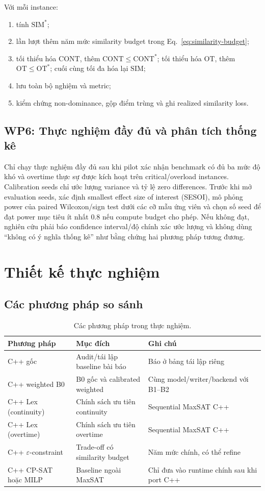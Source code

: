 \documentclass[12pt,a4paper]{article}
\newcommand{\SIM}{\mathrm{SIM}}
\newcommand{\CONT}{\mathrm{CONT}}
\newcommand{\OT}{\mathrm{OT}}
\begin{document}
Với mỗi instance:
\begin{enumerate}
  \item tính $\SIM^*$;
  \item lần lượt thêm năm mức similarity budget trong
        Eq.~\eqref{eq:similarity-budget};
  \item tối thiểu hóa $\CONT$, thêm $\CONT\leq\CONT^*$; tối thiểu hóa $\OT$,
        thêm $\OT\leq\OT^*$; cuối cùng tối đa hóa lại $\SIM$;
  \item lưu toàn bộ nghiệm và metric;
  \item kiểm chứng non-dominance, gộp điểm trùng và ghi realized similarity loss.
\end{enumerate}

\subsection{WP6: Thực nghiệm đầy đủ và phân tích thống kê}

Chỉ chạy thực nghiệm đầy đủ sau khi pilot xác nhận benchmark có đủ ba mức độ
khó và overtime thực sự được kích hoạt trên critical/overload instances.
Calibration seeds chỉ ước lượng variance và tỷ lệ zero differences. Trước khi
mở evaluation seeds, xác định smallest effect size of interest (SESOI), mô phỏng
power của paired Wilcoxon/sign test dưới các cỡ mẫu ứng viên và chọn số seed để
đạt power mục tiêu ít nhất $0.8$ nếu compute budget cho phép. Nếu không đạt,
nghiên cứu phải báo confidence interval/độ chính xác ước lượng và không dùng
``không có ý nghĩa thống kê'' như bằng chứng hai phương pháp tương đương.

\section{Thiết kế thực nghiệm}

\subsection{Các phương pháp so sánh}

\begin{table}[H]
\centering
\caption{Các phương pháp trong thực nghiệm.}
\begin{tabularx}{\textwidth}{@{}>{\raggedright\arraybackslash}p{3.4cm}YY@{}}
\toprule
Phương pháp & Mục đích & Ghi chú \\
\midrule
C++ gốc & Audit/tái lập baseline bài báo & Báo ở bảng tái lập riêng \\
C++ weighted B0 & B0 gốc và calibrated weighted & Cùng model/writer/backend với B1--B2 \\
C++ Lex (continuity) & Chính sách ưu tiên continuity & Sequential MaxSAT C++ \\
C++ Lex (overtime) & Chính sách ưu tiên overtime & Sequential MaxSAT C++ \\
C++ $\varepsilon$-constraint & Trade-off có similarity budget & Năm mức chính, có thể refine \\
C++ CP-SAT hoặc MILP & Baseline ngoài MaxSAT & Chỉ đưa vào runtime chính sau khi port C++ \\
\bottomrule
\end{tabularx}
\end{table}
\end{document}
